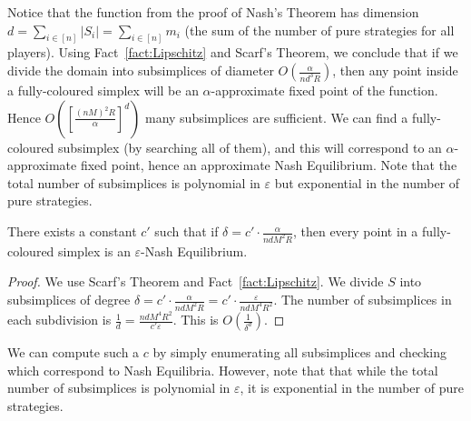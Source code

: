 Notice that the function from the proof of Nash's Theorem has dimension $d =
\sum_{i \in [n]} |S_i| = \sum_{i \in [n]} m_i$ (the sum of the number of pure
strategies for all players). Using Fact~\ref{fact:Lipschitz} and Scarf's
Theorem, we conclude that if we divide the domain into subsimplices of diameter
$O(\frac{\alpha}{nd^3R})$, then any point inside a fully-coloured simplex will
be an $\alpha$-approximate fixed point of the function. Hence $O([ \frac{(nM)^2
R}{\alpha} ]^d)$ many subsimplices are sufficient. We can find a fully-coloured
subsimplex (by searching all of them), and this will correspond to an
$\alpha$-approximate fixed point, hence an approximate Nash Equilibrium. Note
that the total number of subsimplices is polynomial in $\varepsilon$ but
exponential in the number of pure strategies.

\begin{corollary}
	There exists a constant $c'$ such that if $\delta = c' \cdot
	\frac{\alpha}{ndM^2R}$, then every point in a fully-coloured simplex is
	an $\varepsilon$-Nash Equilibrium.
\end{corollary}
\begin{proof}
	We use Scarf's Theorem and Fact~\ref{fact:Lipschitz}. We divide $S$ into
	subsimplices of degree $\delta = c' \cdot \frac{\alpha}{ndM^2R} = c' \cdot
	\frac{\varepsilon}{ndM^4R^2}$. The number of subsimplices in each
	subdivision is $\frac{1}{d} = \frac{ndM^4R^2}{c' \varepsilon}$. This is
	$O(\frac{1}{\delta^d})$.
\end{proof}

We can compute such a $c$ by simply enumerating all subsimplices and checking
which correspond to Nash Equilibria. However, note that that while the total
number of subsimplices is polynomial in $\varepsilon$, it is exponential in the
number of pure strategies.
